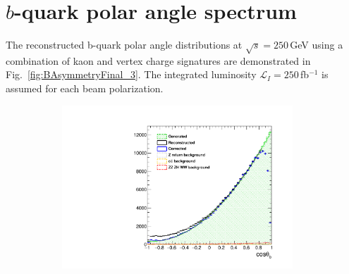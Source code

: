 \documentclass{PoS}
\begin{document}
\section{$b$-quark polar angle spectrum}

The reconstructed b-quark polar angle distributions at $\sqrt{s} = 250$\,GeV using a combination of kaon and vertex charge signatures are demonstrated in Fig.~\ref{fig:BAsymmetryFinal_3}. The integrated luminosity $\mathcal{L}_I = 250$\,fb$^{-1}$ is assumed for each beam polarization.

\begin{figure}
	\centering
	\begin{subfigure}{0.5\textwidth}
		\includegraphics[width=0.95\textwidth]{../ILD/plots/basymmetry-final-left.pdf}
\end{subfigure}
\end{figure}
\end{document}
